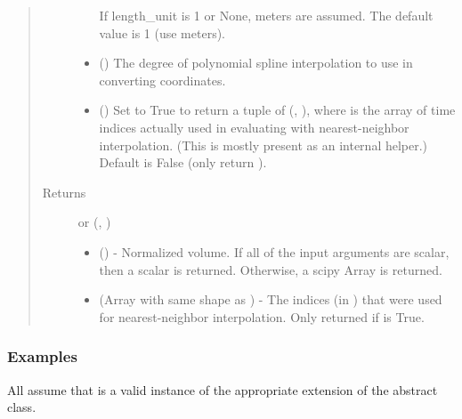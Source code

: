 \documentclass[letterpaper,10pt,english]{sphinxmanual}
\begin{document}
\begin{fulllineitems}
\begin{fulllineitems}
\begin{quote}
\begin{description}
\begin{itemize}
If length\_unit is 1 or None, meters are assumed. The default
value is 1 (use meters).


\item {} 
 () \textendash{} The degree of polynomial spline interpolation to
use in converting coordinates.

\item {} 
 () \textendash{} Set to True to return a tuple of (,
), where  is the array of time indices
actually used in evaluating  with nearest-neighbor
interpolation. (This is mostly present as an internal helper.)
Default is False (only return ).

\end{itemize}

\item[{Returns}] \leavevmode

 or (, )
\begin{itemize}
\item {} 
 () - Normalized volume.
If all of the input arguments are scalar, then a scalar is
returned. Otherwise, a scipy Array is returned.

\item {} 
 (Array with same shape as ) - The indices
(in ) that were used for
nearest-neighbor interpolation. Only returned if  is
True.

\end{itemize}


\end{description}\end{quote}
\subsubsection*{Examples}

All assume that  is a valid instance of the appropriate
extension of the {\hyperref[\detokenize{eqtools:eqtools.core.Equilibrium}]{}} abstract class.


\end{fulllineitems}
\end{fulllineitems}
\end{document}
